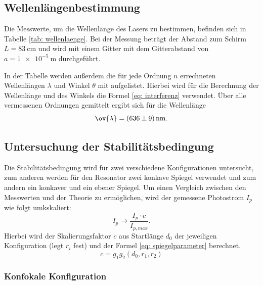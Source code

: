 \subsection{Wellenlängenbestimmung}
Die Messwerte, um die Wellenlänge des Lasers zu bestimmen, befinden sich in Tabelle  \ref{tab: wellenlaenge}.
Bei der Messung beträgt der Abstand zum Schirm $L=\SI{83}{\centi\meter}$ %
und wird mit einem Gitter mit dem Gitterabstand von $a=\SI{1e-5}{\meter}$ durchgeführt. %

In der Tabelle werden außerdem die für jede Ordnung $n$ errechneten Wellenlängen $\lambda$ und Winkel $\theta$
mit aufgelistet. Hierbei wird für die Berechnung der Wellenlänge und des Winkels die Formel \eqref{eq: interferenz} verwendet. %
Über alle vermessenen Ordnungen gemittelt ergibt sich für die Wellenlänge
\begin{equation}
  \label{eq: mittelwert_wellenlaenge}
  \ov{\lambda}=\SI{636\pm9}{\nano\meter}.
\end{equation}
\FloatBarrier
\FloatBarrier
\subsection{Untersuchung der Stabilitätsbedingung} %
Die Stabilitätsbedingung wird für zwei verschiedene Konfigurationen untersucht,
zum anderen werden für den Resonator zwei konkave Spiegel verwendet und zum andern %
ein konkaver und ein ebener Spiegel. %
Um einen Vergleich zwischen den Messwerten und der Theorie zu ermöglichen, wird der gemessene
Photostrom $I_p$ wie folgt umkskaliert: %
\begin{equation*}
  I_p \rightarrow \frac{I_p\cdot c}{I_{p,max}}.
\end{equation*}
Hierbei wird der Skalierungsfaktor $c$ aus Startlänge $d_0$ der jeweiligen Konfiguration (legt $r_i$ fest) und der Formel
\eqref{eq: spiegelparameter} berechnet. %
\begin{equation*}
  c=g_1g_2(d_0, r_1, r_2)
\end{equation*}

\FloatBarrier
\FloatBarrier
\subsubsection{Konfokale Konfiguration} %

